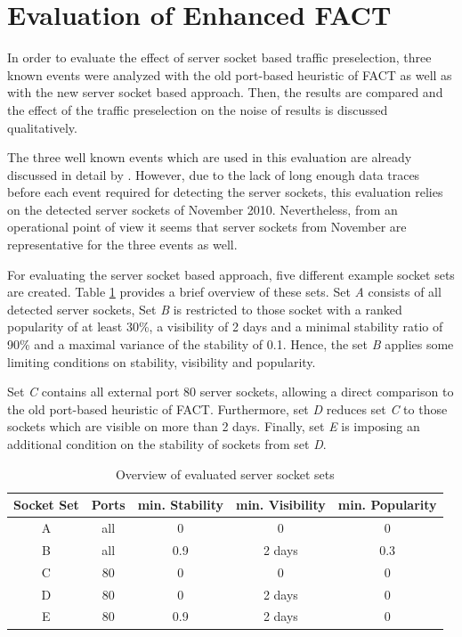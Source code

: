 \section{Evaluation of Enhanced FACT}
In order to evaluate the effect of \gls{server socket} based traffic preselection, three known events were analyzed with the old port-based heuristic of \gls{FACT} as well as with the new \gls{server socket} based approach. Then, the results are 
compared and the effect of the traffic preselection on the noise of results is  
discussed qualitatively.

The three well known events which are used in this evaluation are already 
discussed in detail by \citet{SchatzmannPAM2011}. However, due to the lack of 
long enough data traces before each event required for detecting the server 
sockets, this evaluation relies on the detected \glspl{server socket} of 
November 2010. 
Nevertheless, from an operational point of view it seems that 
\glspl{server socket} from November are representative for the three events as 
well. 

For evaluating the \gls{server socket} based approach, five different example 
socket sets are created. Table \ref{tab:ses_sets} provides a brief overview of 
these sets. Set \emph{A} consists of all detected \glspl{server socket}, Set 
\emph{B} is restricted to those socket with a ranked popularity of at least 
30\%, a visibility of 2 days and a minimal stability ratio of 90\% and a maximal 
variance of the stability of 0.1. Hence, the set \emph{B} applies some limiting 
conditions on stability, visibility and popularity. 

Set \emph{C} contains all external port 80 \glspl{server socket}, allowing a 
direct comparison to the old port-based heuristic of \gls{FACT}. 
Furthermore, set \emph{D} reduces set \emph{C} to those sockets which are 
visible on more than 2 days. 
Finally, set \emph{E} is imposing an additional condition on the stability of 
sockets from set \emph{D}. 

\begin{table}
	[ht] \centering 
	\begin{tabular}
		{|c|c|c|c|c|} \hline \textbf{Socket Set} & \textbf{Ports} & \textbf{min. Stability} & \textbf{min. Visibility} & \textbf{min. Popularity} \\
		\hline \hline A & all & 0 & 0 & 0\\
		\hline B & all & 0.9 & 2 days & 0.3 \\
		\hline C & 80 & 0 & 0 & 0 \\
		\hline D & 80 & 0 & 2 days & 0 \\
		\hline E & 80 & 0.9 & 2 days & 0 \\
		\hline 
	\end{tabular}
	\caption{Overview of evaluated \gls{server socket} sets} 
	\label{tab:ses_sets} 
\end{table}

